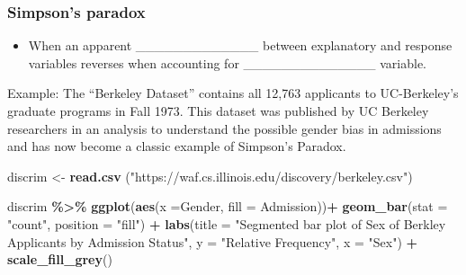 \documentclass[
]{report}
\newenvironment{Shaded}{\begin{snugshade}}{\end{snugshade}}
\newcommand{\AttributeTok}[1]{\textcolor[rgb]{0.13,0.29,0.53}{#1}}
\newcommand{\FunctionTok}[1]{\textcolor[rgb]{0.13,0.29,0.53}{\textbf{#1}}}
\newcommand{\NormalTok}[1]{#1}
\newcommand{\OtherTok}[1]{\textcolor[rgb]{0.56,0.35,0.01}{#1}}
\newcommand{\SpecialCharTok}[1]{\textcolor[rgb]{0.81,0.36,0.00}{\textbf{#1}}}
\newcommand{\StringTok}[1]{\textcolor[rgb]{0.31,0.60,0.02}{#1}}
\providecommand{\tightlist}{%
  \setlength{\itemsep}{0pt}\setlength{\parskip}{0pt}}
\begin{document}
\vspace{0.2in}

\newpage

\hypertarget{simpsons-paradox}{%
\subsubsection*{Simpson's paradox}\label{simpsons-paradox}}


\begin{itemize}
\tightlist
\item
  When an apparent \_\_\_\_\_\_\_\_\_\_\_\_\_ between explanatory and response variables reverses when accounting for \_\_\_\_\_\_\_\_\_\_\_\_\_\_ variable.
\end{itemize}


Example: The ``Berkeley Dataset'' contains all 12,763 applicants to UC-Berkeley's graduate programs in Fall 1973. This dataset was published by UC Berkeley researchers in an analysis to understand the possible gender bias in admissions and has now become a classic example of Simpson's Paradox.

\begin{Shaded}
\begin{Highlighting}[]
\NormalTok{discrim }\OtherTok{\textless{}{-}} \FunctionTok{read.csv}\NormalTok{ (}\StringTok{"https://waf.cs.illinois.edu/discovery/berkeley.csv"}\NormalTok{)}

\NormalTok{discrim }\SpecialCharTok{\%\textgreater{}\%}
  \FunctionTok{ggplot}\NormalTok{(}\FunctionTok{aes}\NormalTok{(}\AttributeTok{x =}\NormalTok{Gender, }\AttributeTok{fill =}\NormalTok{ Admission))}\SpecialCharTok{+}
  \FunctionTok{geom\_bar}\NormalTok{(}\AttributeTok{stat =} \StringTok{"count"}\NormalTok{, }\AttributeTok{position =} \StringTok{"fill"}\NormalTok{) }\SpecialCharTok{+}
  \FunctionTok{labs}\NormalTok{(}\AttributeTok{title =} \StringTok{"Segmented bar plot of Sex of Berkley Applicants by }
\StringTok{       Admission Status"}\NormalTok{,}
       \AttributeTok{y =} \StringTok{"Relative Frequency"}\NormalTok{,}
       \AttributeTok{x =} \StringTok{"Sex"}\NormalTok{) }\SpecialCharTok{+}
  \FunctionTok{scale\_fill\_grey}\NormalTok{()}
\end{Highlighting}
\end{Shaded}
\end{document}
